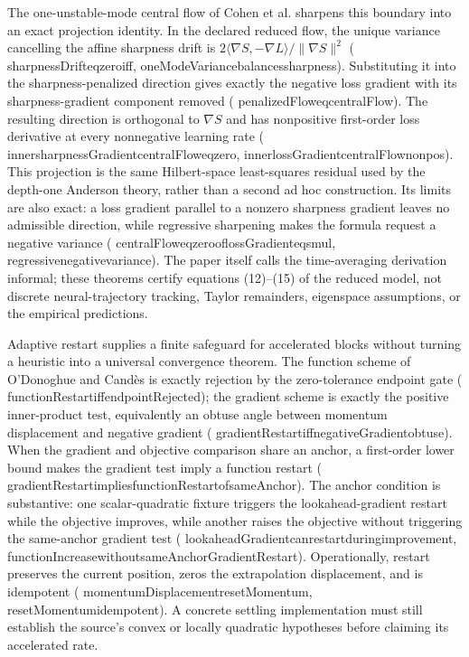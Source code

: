 \documentclass[11pt]{article}
\newcommand{\leanname}[1]{{\scriptsize\ttfamily
  \def\_{\textunderscore\allowbreak}#1}}
\begin{document}
The one-unstable-mode central flow of Cohen et al.
\cite{cohen2024central} sharpens this boundary into an exact projection
identity.  In the declared reduced flow, the unique variance cancelling the
affine sharpness drift is
$2\langle\nabla S,-\nabla L\rangle/\lVert\nabla S\rVert^2$
(\leanname{sharpnessDrift\_eq\_zero\_iff},
\leanname{oneModeVariance\_balances\_sharpness}).  Substituting it into the
sharpness-penalized direction gives exactly the negative loss gradient with
its sharpness-gradient component removed
(\leanname{penalizedFlow\_eq\_centralFlow}).  The resulting direction is
orthogonal to $\nabla S$ and has nonpositive first-order loss derivative at
every nonnegative learning rate
(\leanname{inner\_sharpnessGradient\_centralFlow\_eq\_zero},
\leanname{inner\_lossGradient\_centralFlow\_nonpos}).  This projection is the
same Hilbert-space least-squares residual used by the depth-one Anderson
theory, rather than a second ad hoc construction.  Its limits are also exact:
a loss gradient parallel to a nonzero sharpness gradient leaves no admissible
direction, while regressive sharpening makes the formula request a negative
variance
(\leanname{centralFlow\_eq\_zero\_of\_lossGradient\_eq\_smul},
\leanname{regressive\_negative\_variance}).  The paper itself calls
the time-averaging derivation informal; these theorems certify equations
(12)--(15) of the reduced model, not discrete neural-trajectory tracking,
Taylor remainders, eigenspace assumptions, or the empirical predictions.

Adaptive restart supplies a finite safeguard for accelerated blocks without
turning a heuristic into a universal convergence theorem.  The function scheme
of O'Donoghue and Cand\`es \cite{odonoghue2012restart} is exactly rejection by
the zero-tolerance endpoint gate
(\leanname{functionRestart\_iff\_endpointRejected}); the gradient scheme is
exactly the positive inner-product test, equivalently an obtuse angle between
momentum displacement and negative gradient
(\leanname{gradientRestart\_iff\_negativeGradient\_obtuse}).  When the gradient
and objective comparison share an anchor, a first-order lower bound makes the
gradient test imply a function restart
(\leanname{gradientRestart\_implies\_functionRestart\_of\_sameAnchor}).
The anchor condition is substantive: one scalar-quadratic fixture triggers the
lookahead-gradient restart while the objective improves, while another raises
the objective without triggering the same-anchor gradient test
(\leanname{lookaheadGradient\_can\_restart\_during\_improvement},
\leanname{functionIncrease\_without\_sameAnchorGradientRestart}).
Operationally, restart preserves the current position, zeros the extrapolation
displacement, and is idempotent
(\leanname{momentumDisplacement\_resetMomentum},
\leanname{resetMomentum\_idempotent}).  A concrete settling implementation must
still establish the source's convex or locally quadratic hypotheses before
claiming its accelerated rate.
\end{document}
